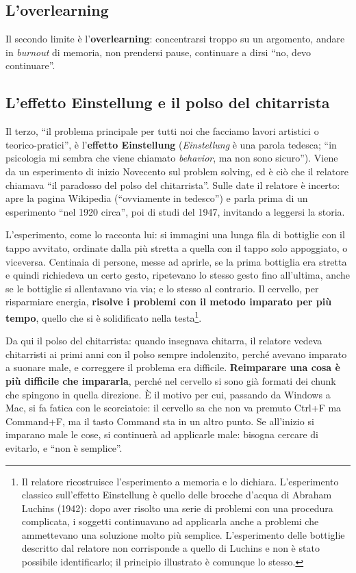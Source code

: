 \subsection{L'overlearning}

Il secondo limite è l'\textbf{overlearning}: concentrarsi troppo su un
argomento, andare in \emph{burnout} di memoria, non prendersi pause,
continuare a dirsi ``no, devo continuare''.

\subsection{L'effetto Einstellung e il polso del chitarrista}

Il terzo, ``il problema principale per tutti noi che facciamo lavori
artistici o teorico-pratici'', è l'\textbf{effetto Einstellung}
(\emph{Einstellung} è una parola tedesca; ``in psicologia mi sembra che
viene chiamato \emph{behavior}, ma non sono sicuro''). Viene da un
esperimento di inizio Novecento sul problem solving, ed è ciò che il
relatore chiamava ``il paradosso del polso del chitarrista''. Sulle date il
relatore è incerto: apre la pagina Wikipedia (``ovviamente in tedesco'') e
parla prima di un esperimento ``nel 1920 circa'', poi di studi del 1947,
invitando a leggersi la storia.

L'esperimento, come lo racconta lui: si immagini una lunga fila di
bottiglie con il tappo avvitato, ordinate dalla più stretta a quella con il
tappo solo appoggiato, o viceversa. Centinaia di persone, messe ad aprirle,
se la prima bottiglia era stretta e quindi richiedeva un certo gesto,
ripetevano lo stesso gesto fino all'ultima, anche se le bottiglie si
allentavano via via; e lo stesso al contrario. Il cervello, per risparmiare
energia, \textbf{risolve i problemi con il metodo imparato per più tempo},
quello che si è solidificato nella testa\footnote{Il relatore ricostruisce
l'esperimento a memoria e lo dichiara. L'esperimento classico sull'effetto
Einstellung è quello delle brocche d'acqua di Abraham Luchins (1942):
dopo aver risolto una serie di problemi con una procedura complicata, i
soggetti continuavano ad applicarla anche a problemi che ammettevano una
soluzione molto più semplice. L'esperimento delle bottiglie descritto dal
relatore non corrisponde a quello di Luchins e non è stato possibile
identificarlo; il principio illustrato è comunque lo stesso.}.

Da qui il polso del chitarrista: quando insegnava chitarra, il relatore
vedeva chitarristi ai primi anni con il polso sempre indolenzito, perché
avevano imparato a suonare male, e correggere il problema era difficile.
\textbf{Reimparare una cosa è più difficile che impararla}, perché nel
cervello si sono già formati dei chunk che spingono in quella direzione. È
il motivo per cui, passando da Windows a Mac, si fa fatica con le
scorciatoie: il cervello sa che non va premuto Ctrl+F ma Command+F, ma il
tasto Command sta in un altro punto. Se all'inizio si imparano male le
cose, si continuerà ad applicarle male: bisogna cercare di evitarlo, e
``non è semplice''.

